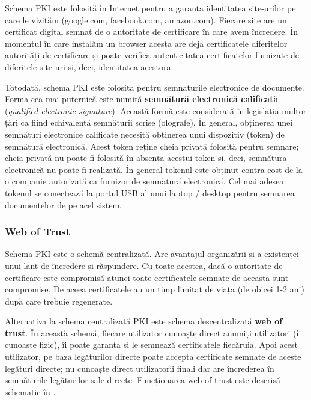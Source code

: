 Schema PKI este folosită în Internet pentru a garanta identitatea site-urilor pe care le vizităm (google.com, facebook.com, amazon.com). Fiecare site are un certificat digital semnat de o autoritate de certificare în care avem încredere. În momentul în care instalăm un browser acesta are deja certificatele diferitelor autorități de certificare și poate verifica autenticitatea certificatelor furnizate de diferitele site-uri și, deci, identitatea acestora.

Totodată, schema PKI este folosită pentru semnăturile electronice de documente.
Forma cea mai puternică este numită \textbf{semnătură electronică calificată} (\textit{qualified electronic signature}).
Această formă este considerată în legislația multor țări ca fiind echivalentă semnăturii scrise (olografe).
În general, obținerea unei semnături electronice calificate necesită obținerea unui dispozitiv (token) de semnătură electronică.
Acest token reține cheia privată folosită pentru semnare; cheia privată nu poate fi folosită în absența acestui token și, deci, semnătura electronică nu poate fi realizată.
În general tokenul este obținut contra cost de la o companie autorizată ca furnizor de semnătură electronică.
Cel mai adesea tokenul se conectează la portul USB al unui laptop / desktop pentru semnarea documentelor de pe acel sistem.

\subsubsection{Web of Trust}
\label{sec:sec:transfer:sign:wot}

Schema PKI este o schemă centralizată. Are avantajul organizării și a existenței unui lanț de încredere și răspundere. Cu toate acestea, dacă o autoritate de certificare este compromisă atunci toate certificatele semnate de aceasta sunt compromise. De aceea certificatele au un timp limitat de viața (de obicei 1-2 ani) după care trebuie regenerate.

Alternativa la schema centralizată PKI este schema descentralizată \textbf{web of trust}. În această schemă, fiecare utilizator cunoaște direct anumiți utilizatori (îi cunoaște fizic), îi poate garanta și le semnează certificatele fiecăruia. Apoi acest utilizator, pe baza legăturilor directe poate accepta certificate semnate de aceste legături directe; nu cunoaște direct utilizatorii finali dar are încrederea în semnăturile legăturilor sale directe. Funcționarea web of trust este descrisă schematic în .

